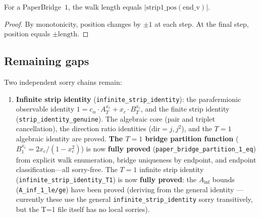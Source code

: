 \begin{lemma}
\begin{lemma}\label{lem:bridge_length_pos}
\leanok
{}
  For a PaperBridge~$1$, the walk length equals $|\mathrm{strip1\_pos}(\mathrm{end\_v})|$.
\end{lemma}
\begin{proof}\leanok
  By monotonicity, position changes by $\pm 1$ at each step.
  At the final step, position equals $\pm\mathrm{length}$.
\end{proof}

\subsection*{Remaining gaps}

Two independent sorry chains remain:
\begin{enumerate}
\item \textbf{Infinite strip identity} (\texttt{infinite\_strip\_identity}): the
  parafermionic observable identity $1 = c_\alpha \cdot A_T^{x_c} + x_c \cdot B_T^{x_c}$,
  and the finite strip identity (\texttt{strip\_identity\_genuine}).
  The algebraic core (pair and triplet cancellation), the direction ratio identities
  ($\mathrm{dir} = j, j^2$), and the $T{=}1$ algebraic identity are proved.
  \textbf{The $T = 1$ bridge partition function} ($B_1^{x_c} = 2x_c/(1-x_c^2)$) is
  now \textbf{fully proved} (\texttt{paper\_bridge\_partition\_1\_eq}) from
  explicit walk enumeration, bridge uniqueness by endpoint, and endpoint
  classification---all sorry-free.
  The $T = 1$ infinite strip identity (\texttt{infinite\_strip\_identity\_T1})
  is now \textbf{fully proved}: the $A_{\inf}$ bounds
  (\texttt{A\_inf\_1\_le/ge}) have been proved (deriving from the general
  identity --- currently these use the general \texttt{infinite\_strip\_identity}
  sorry transitively, but the T=1 file itself has no local sorries).


\end{enumerate}
\end{lemma}
